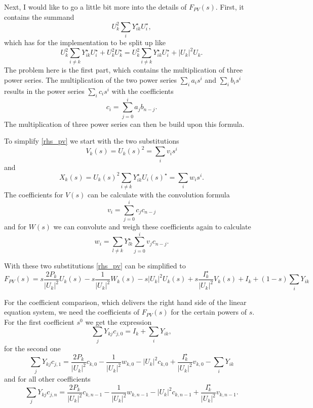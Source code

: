 Next, I would like to go a little bit more into the details of $F_{PV}(s)$. First, it contains the summand 
\begin{equation}
	U_k^2 \sum_i Y_{ik}^\star U_i^\star,
\end{equation}
which has for the implementation to be split up like
\begin{equation}
	U_k^2 \sum_{i \ne k} Y_{ik}^\star U_i^\star + U_k^2 U_k^\star = U_k^2 \sum_{i \ne k} Y_{ik}^\star U_i^\star + |U_k|^2 U_k.
\end{equation}
The problem here is the first part, which contains the multiplication of three power series. The multiplication of the two power series $\sum_i a_i s^i$ and $\sum_i b_i s^i$ results in the power series $\sum_i c_i s^i$ with the coefficients
\begin{equation}
	c_i = \sum_{j = 0}^i a_j b_{n - j}.
\end{equation}
The multiplication of three power series can then be build upon this formula.

To simplify \eqref{rhs_pv} we start with the two substitutions
\begin{equation}
	V_k(s) = U_k(s)^2 = \sum_i v_i s^i
\end{equation}
and
\begin{equation}
	X_k(s) = U_k(s)^2 \sum_{i \ne k} Y_{ik}^\star U_i(s)^\star = \sum_i w_i s^i.
\end{equation}
The coefficients for $V(s)$ can be calculate with the convolution formula
\begin{equation}
	v_i = \sum_{j = 0}^i c_j c_{n - j}
\end{equation}
and for $W(s)$ we can convolute and weigh these coefficients again to calculate
\begin{equation}
	w_i = \sum_{l \ne k} Y_{lk}^\star \sum_{j = 0}^i v_j c_{n - j}.
\end{equation}

With these two substitutions \eqref{rhs_pv} can be simplified to
\begin{equation}
	F_{PV}(s) = s \frac{2 P_k}{|U_k|^2} U_k(s) - s \frac{1}{|U_k|^2} W_k(s) - s |U_k|^2 U_k(s) + s \frac{I_k^\star}{|U_k|^2} V_k(s) + I_k + (1 - s) \sum_i Y_{ik}
\end{equation}

For the coefficient comparison, which delivers the right hand side of the linear equation system, we need the coefficients of $F_{PV}(s)$ for the certain powers of $s$. For the first coefficient $s^0$ we get the expression
\begin{equation}
	\sum_j Y_{kj} c_{j,0} = I_k + \sum_i Y_{ik},
\end{equation}
for the second one
\begin{equation}
	\sum_j Y_{kj} c_{j,1} = \frac{2 P_k}{|U_k|^2} c_{k,0} - \frac{1}{|U_k|^2} w_{k,0} - |U_k|^2 c_{k,0} + \frac{I_k^\star}{|U_k|^2} v_{k,0} - \sum_i Y_{ik}
\end{equation}
and for all other coefficients
\begin{equation}
	\sum_j Y_{kj} c_{j,n} = \frac{2 P_k}{|U_k|^2} c_{k,n-1} - \frac{1}{|U_k|^2} w_{k,n-1} - |U_k|^2 c_{k,n-1} + \frac{I_k^\star}{|U_k|^2} v_{k,n-1}.
\end{equation}

